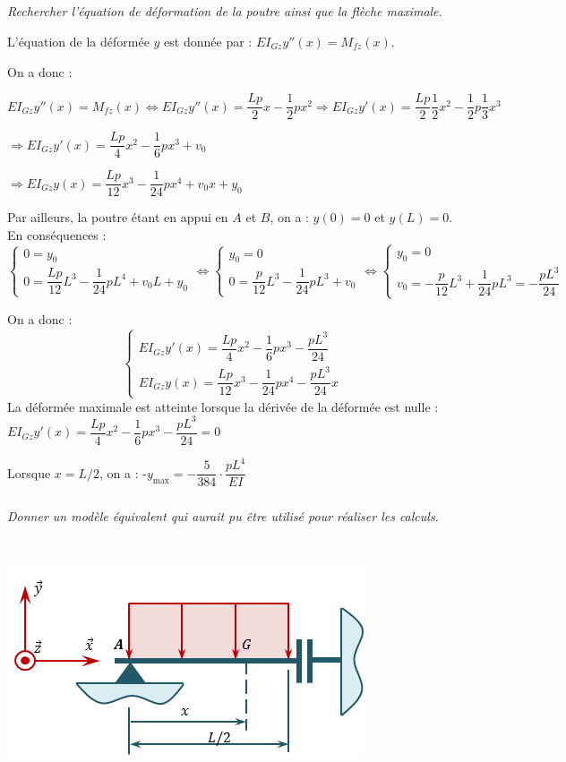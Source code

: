 \documentclass[10pt,fleqn]{article} %
\begin{document}
\subparagraph{}\textit{Rechercher l'équation de déformation de la poutre ainsi que la flèche maximale.}
\ifprof
\begin{corrige}
L'équation de la déformée $y$ est donnée par : $EI_{Gz} y''(x)= M_{fz}(x)$. 

On a donc :

$
EI_{Gz} y''(x)= M_{fz}(x) 
\Leftrightarrow  EI_{Gz} y''(x)= \dfrac{Lp}{2}x-\dfrac{1}{2}px^2 
\Rightarrow  EI_{Gz} y'(x)= \dfrac{Lp}{2}\dfrac{1}{2}x^2 -\dfrac{1}{2}p\dfrac{1}{3}x^3$

$ \Rightarrow  EI_{Gz} y'(x)= \dfrac{Lp}{4}x^2 -\dfrac{1}{6}px^3 + v_0 $

$ \Rightarrow  EI_{Gz} y(x)= \dfrac{Lp}{12}x^3 -\dfrac{1}{24}px^4  + v_0 x +y_0$

Par ailleurs, la poutre étant en appui en $A$ et $B$, on a : $y(0) = 0$ et $y(L) = 0$.
En conséquences : 
$$
\left\{ 
\begin{array}{l}
0 = y_0 \\
0= \dfrac{Lp}{12}L^3 -\dfrac{1}{24}pL^4  + v_0 L +y_0
\end{array}
\right.
\Longleftrightarrow
\left\{ 
\begin{array}{l}
y_0 = 0 \\
0= \dfrac{p}{12}L^3 -\dfrac{1}{24}pL^3  + v_0 
\end{array}
\right.
\Longleftrightarrow
\left\{ 
\begin{array}{l}
y_0 = 0 \\
 v_0 = -\dfrac{p}{12}L^3 +\dfrac{1}{24}pL^3 =-\dfrac{pL^3}{24} 
\end{array}
\right.
$$


On a donc : 
$$
\left\{ 
\begin{array}{l}
  EI_{Gz} y'(x)= \dfrac{Lp}{4}x^2 -\dfrac{1}{6}px^3 -\dfrac{pL^3}{24} \\
  EI_{Gz} y(x)= \dfrac{Lp}{12}x^3 -\dfrac{1}{24}px^4  -\dfrac{pL^3}{24} x 
\end{array}
\right.
$$
La déformée maximale est atteinte lorsque la dérivée de la déformée est nulle :
$
  EI_{Gz} y'(x)= \dfrac{Lp}{4}x^2 -\dfrac{1}{6}px^3 -\dfrac{pL^3}{24}  = 0
$

Lorsque $x=L/2$, on a : -$y_{\text{max}}=-\dfrac{5}{384} \cdot \dfrac{pL^4}{EI}$

\end{corrige}
\else
\fi



\subparagraph{}\textit{Donner un modèle équivalent qui aurait pu être utilisé pour réaliser les calculs. }
\ifprof
\begin{corrige}
~\\
\begin{center}
\includegraphics[width=.45\textwidth]{images/fig_05}
\end{center}
\end{corrige}
\else
\fi




\end{document}
